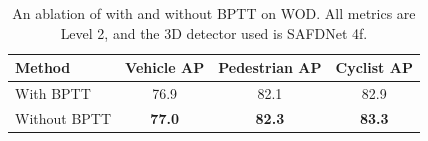 \begin{table}[t]
    \centering
    \footnotesize
    \begin{tabular}{@{}lccc@{}}
        \toprule
        Method                              & Vehicle AP    & Pedestrian AP & Cyclist AP     \\ 
        \midrule
        With BPTT                       & 76.9        & 82.1          & 82.9           \\ 
        Without BPTT                    & \textbf{77.0} & \textbf{82.3} & \textbf{83.3}  \\
        \bottomrule
    \end{tabular}
    \caption{An ablation of \ourmodel{} with and without BPTT on WOD. All metrics are Level 2, and the 3D detector used is SAFDNet 4f.}
    \label{tab:bptt}
\end{table}
